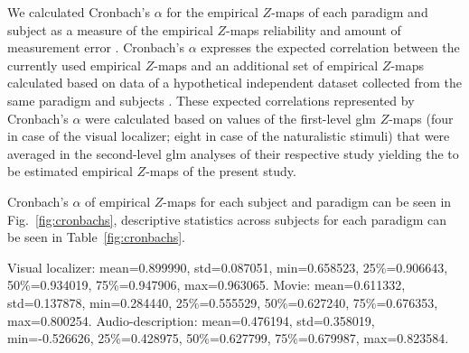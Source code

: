 
%
We calculated Cronbach's $\alpha$ for the empirical $Z$-maps of each paradigm
and subject as a measure of the empirical $Z$-maps reliability and amount of
measurement error \citep{cronbach1951coefficient, cortina1993coefficient}.
%
Cronbach's $\alpha$ expresses the expected correlation between the currently
used empirical $Z$-maps and an additional set of empirical $Z$-maps calculated
based on data of a hypothetical independent dataset collected from the same
paradigm and subjects \citep{jiahui2020predicting, jiahui2022cross}.
%
These expected correlations represented by Cronbach's $\alpha$ were calculated
based on values of the first-level \ac{glm} $Z$-maps (four in case of the visual
localizer; eight in case of the naturalistic stimuli) that were averaged in the
second-level \ac{glm} analyses of their respective study
\citep{sengupta2016extension, haeusler2022processing} yielding the to be
estimated empirical $Z$-maps of the present study.






%
Cronbach's $\alpha$ of empirical $Z$-maps for each subject and paradigm can be
seen in Fig.~\ref{fig:cronbachs}, descriptive statistics across subjects for
each paradigm can be seen in Table~\ref{fig:cronbachs}.


Visual localizer:  mean=0.899990, std=0.087051, min=0.658523,
25\%=0.906643, 50\%=0.934019, 75\%=0.947906, max=0.963065.
%
Movie: mean=0.611332, std=0.137878, min=0.284440,
25\%=0.555529, 50\%=0.627240, 75\%=0.676353, max=0.800254.
%
Audio-description: mean=0.476194, std=0.358019, min=-0.526626,
25\%=0.428975, 50\%=0.627799, 75\%=0.679987, max=0.823584.


